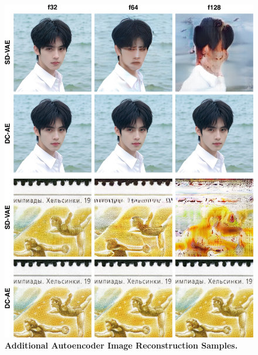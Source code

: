 \begin{figure}[ht]
    \centering
    \includegraphics[width=1\linewidth]{figures/src/ae_visualization_1.pdf}
    \caption{\textbf{Additional Autoencoder Image Reconstruction Samples.}}
    \label{fig:ae_visualization_1}
\end{figure}
